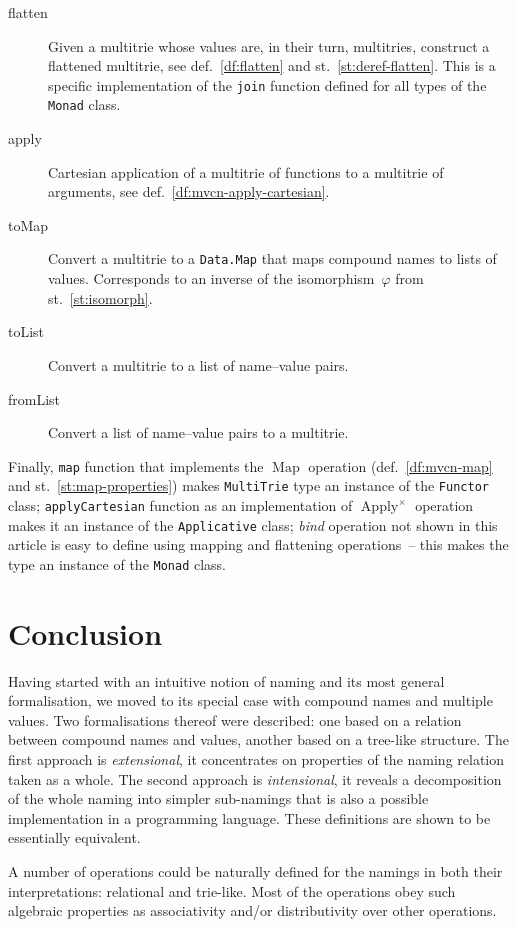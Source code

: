 \documentclass{article}
\theoremstyle{definition}
\newcommand{\fmap}{\operatorname{Map}}
\newcommand{\apply}{\operatorname{Apply}}
\begin{document}
\begin{description}
\item [flatten]
  Given a multitrie whose values are, in their turn, multitries, construct
  a flattened multitrie, see def.~\ref{df:flatten} and
  st.~\ref{st:deref-flatten}. This is a specific implementation of the
  \lstinline{join} function defined for all types of the \lstinline{Monad}
  class.
\item [apply]
  Cartesian
  application of a multitrie of functions to a multitrie of arguments, see
  def.~\ref{df:mvcn-apply-cartesian}.
\item [toMap]
  Convert a multitrie to a \lstinline{Data.Map} that maps compound names to
  lists of values. Corresponds to an inverse of the isomorphism~$\varphi$
  from st.~\ref{st:isomorph}.
\item [toList]
  Convert a multitrie to a list of name--value pairs.
\item [fromList]
  Convert a list of name--value pairs to a multitrie.
\end{description}

Finally, \lstinline{map} function that implements the $\fmap$ operation
(def.~\ref{df:mvcn-map} and st.~\ref{st:map-properties})
makes \lstinline{MultiTrie} type an instance of the \lstinline{Functor} class; 
\lstinline{applyCartesian} function as an implementation of $\apply^{\times}$
operation makes it an instance of the \lstinline{Applicative} class; 
\emph{bind} operation not shown in this article is easy to define using mapping
and flattening operations~-- this makes the type an instance of the
\lstinline{Monad} class.



\section{Conclusion}

Having started with an intuitive notion of naming and its most general
formalisation, we moved to its special case with compound names and multiple
values. Two formalisations thereof were described: one based on
a relation between compound names and values, another based on
a tree-like structure.
The first approach is \emph{extensional}, it concentrates on properties of the
naming relation taken as a whole. The second approach is \emph{intensional}, it
reveals a decomposition of the whole naming into simpler sub-namings that
is also a possible implementation in a programming language.
These definitions are shown to be essentially equivalent.

A number of operations could be naturally defined for the namings in both
their interpretations: relational and trie-like. Most of the operations obey
such algebraic properties as associativity and/or distributivity over other
operations.
\end{document}
